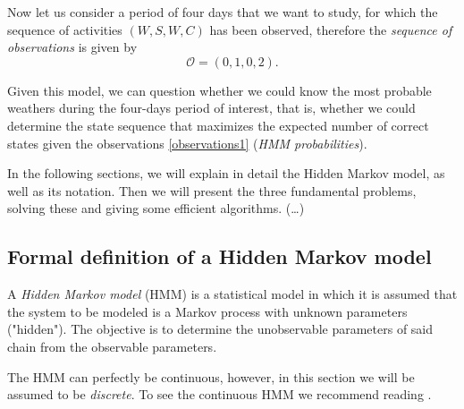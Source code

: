 \documentclass[12pt]{article}
\def\OO{\mathcal{O}}
\numberwithin{equation}{section}
\begin{document}
Now let us consider a period of four days that we want to study, for which the sequence of activities $(W, S, W, C)$ has been observed, therefore the \emph{sequence of observations} is given by
\begin{equation}\label{observations1}
\OO = (0,1,0,2).
\end{equation}

Given this model, we can question whether we could know the most probable weathers during the four-days period of interest, that is, whether we could determine the state sequence that maximizes the expected number of correct states given the observations \ref{observations1} (\emph{HMM probabilities}).

In the following sections, we will explain in detail the Hidden Markov model, as well as its notation. Then we will present the three fundamental problems, solving these and giving some efficient algorithms. (…)


\subsection{Formal definition of a Hidden Markov model}

A \emph{Hidden Markov model} (HMM) is a statistical model in which it is assumed that the system to be modeled is a Markov process with unknown parameters ("hidden"). The objective is to determine the unobservable parameters of said chain from the observable parameters.

The HMM can perfectly be continuous, however, in this section we will be assumed to be \emph{discrete}. To see the continuous HMM we recommend reading \cite{petrushin2000hidden}.
\end{document}
